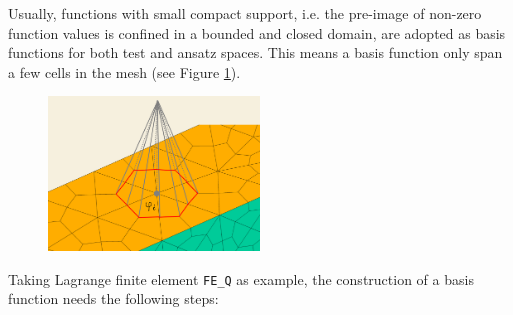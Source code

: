 \documentclass[11pt, a4paper]{article}
\begin{document}
Usually, functions with small compact support, i.e. the pre-image of non-zero function
values is confined in a bounded and closed domain, are adopted as basis functions for both
test and ansatz spaces. This means a basis function only span a few cells in the mesh (see
Figure \ref{fig:basis-function-with-compact-support}).
\begin{figure}[htbp]
  \centering
  \includegraphics[width=0.5\textwidth, height=\textheight,
  keepaspectratio]{figures/basis-function-with-compact-support-on-mesh-draft}
  \caption{}
  \label{fig:basis-function-with-compact-support}
\end{figure}
Taking Lagrange finite element \texttt{FE\_Q} as example, the construction of a basis
function needs the following steps:
\end{document}
